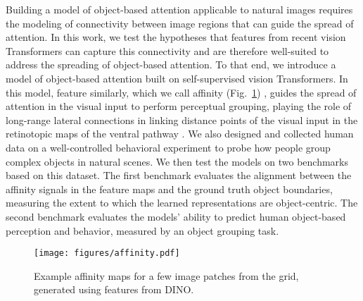 \documentclass{article}
\begin{document}

Building a model of object-based attention applicable to natural images requires the modeling of connectivity between image regions that can guide the spread of attention. In this work, we test the hypotheses that features from recent vision Transformers can capture this connectivity and are therefore well-suited to address the spreading of object-based attention. To that end, we introduce a model of object-based attention built on self-supervised vision Transformers. In this model, feature similarly, which we call affinity (Fig.~\ref{fig:affinity_maps}) \citep{chen2022unsupervised}, guides the spread of attention in the visual input to perform perceptual grouping, playing the role of long-range lateral connections in linking distance points of the visual input in the retinotopic maps of the ventral pathway \citep{gilbert_top-down_2013, ramalingam2013top}. We also designed and collected human data on a well-controlled behavioral experiment to probe how people group complex objects in natural scenes. We then test the models on two benchmarks based on this dataset. The first benchmark evaluates the alignment between the affinity signals in the feature maps and the ground truth object boundaries, measuring the extent to which the learned representations are object-centric. The second benchmark evaluates the models' ability to predict human object-based perception and behavior, measured by an object grouping task.


 




\begin{figure}[h]
\begin{center}
\texttt{[image: figures/affinity.pdf]}
\end{center}
\caption{Example affinity maps for a few image patches from the grid, generated using features from DINO.} 
\label{fig:affinity_maps}
\end{figure}
\end{document}
